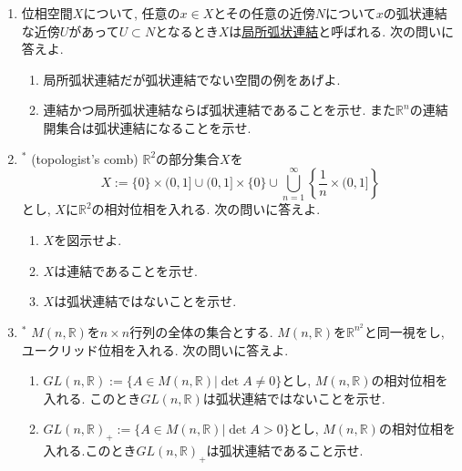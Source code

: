 \documentclass[dvipdfmx,a4paper,11pt]{article}
\newcommand{\R}{\mathbb{R}}
\theoremstyle{definition}
\newcommand{\pdrv}[2]{\frac{\partial #1}{\partial #2}}
\begin{document}
\begin{enumerate}[label=\textbf{問}\ref*{sec-connected}.\arabic*]
\item 位相空間$X$について, 任意の$x \in X$とその任意の近傍$N$について$x$の弧状連結な近傍$U$があって$U \subset N$となるとき$X$は\underline{局所弧状連結}と呼ばれる. 次の問いに答えよ.
	\begin{enumerate}
	\setlength{\parskip}{0cm} 
  \setlength{\itemsep}{0pt} 
	\item 局所弧状連結だが弧状連結でない空間の例をあげよ.
	\item 連結かつ局所弧状連結ならば弧状連結であることを示せ. また$\R^n$の連結開集合は弧状連結になることを示せ. 
	\end{enumerate}
\item $^{*}$ (topologist's comb) $\R^2$の部分集合$X$を
$$
X := \{ 0\} \times (0,1] \cup (0,1] \times \{ 0 \} \cup \bigcup_{n=1}^{\infty}\left\{ \frac{1}{n} \times (0,1] \right\}
$$
とし, $X$に$\R^2$の相対位相を入れる. 次の問いに答えよ. 
	\begin{enumerate}
	\setlength{\parskip}{0cm} 
  \setlength{\itemsep}{0pt} 
  \item $X$を図示せよ. 
  \item $X$は連結であることを示せ.
  \item $X$は弧状連結ではないことを示せ. %
  	\end{enumerate}



\item \label{gl} $^{*}$  $M(n,\R)$を$n\times n$行列の全体の集合とする.  $M(n,\R)$を$\R^{n^2}$と同一視をし, ユークリッド位相を入れる. 次の問いに答えよ.
	\begin{enumerate}
		\setlength{\parskip}{0cm} 
  \setlength{\itemsep}{0pt} 
	\item $GL(n, \R):= \{ A \in M(n,\R) | \det A \neq 0\}$とし, $M(n,\R)$の相対位相を入れる. このとき$GL(n, \R)$は弧状連結ではないことを示せ.
	\item $GL(n, \R)_{+}:=\{ A \in M(n,\R) | \det A > 0\}$とし, $M(n,\R)$の相対位相を入れる.このとき$GL(n, \R)_{+}$は弧状連結であること示せ.
	\end{enumerate}


\end{enumerate}
\end{document}

